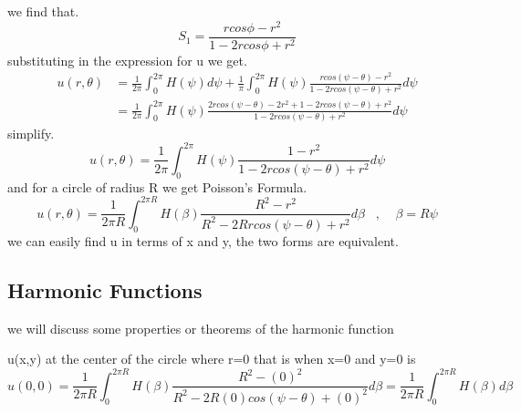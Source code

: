 \documentclass[]{article}
\begin{document}
we find that.
\[
    S_1 = \frac{rcos\phi - r^2}{1-2rcos\phi+r^2}    
\]
substituting in the expression for u we get.
\begin{align*}
u(r,\theta) &= \frac{1}{2\pi}\int_{0}^{2\pi} H(\psi ) d\psi  + \frac{1}{\pi}\int_{0}^{2\pi} H(\psi )\frac{rcos(\psi  -\theta) - r^2}{1-2rcos(\psi  -\theta)+r^2}d\psi 
\\
            &= \frac{1}{2\pi}\int_{0}^{2\pi} H(\psi )\frac{2rcos(\psi  -\theta) - 2r^2+1-2rcos(\psi  -\theta)+r^2}{1-2rcos(\psi  -\theta)+r^2}d\psi 
\end{align*}
simplify.
\[
    u(r,\theta) = \frac{1}{2\pi}\int_{0}^{2\pi} H(\psi )\frac{1-r^2}{1-2rcos(\psi  -\theta)+r^2}d\psi     
\]
and for a circle of radius R we get Poisson's Formula.
\[
    u(r,\theta) = \frac{1}{2\pi R}\int_{0}^{2\pi R} H(\beta)\frac{R^2-r^2}{R^2-2Rrcos(\psi  -\theta)+r^2}d\beta \;\;\;, \;\;\;\; \beta = R\psi     
\]
we can easily find u in terms of x and y, the two forms are equivalent.

\subsection{Harmonic Functions}
we will discuss some properties or theorems of the harmonic function

\begin{observation}
    u(x,y) at the center of the circle where r=0 that is when x=0 and y=0 is
    \[
        u(0,0) = \frac{1}{2\pi R}\int_{0}^{2\pi R} H(\beta)\frac{R^2-(0)^2}{R^2-2R(0)cos(\psi  -\theta)+(0)^2}d\beta =\frac{1}{2\pi R}\int_{0}^{2\pi R} H(\beta)d\beta     
    \]
\end{observation}    
\end{document}
